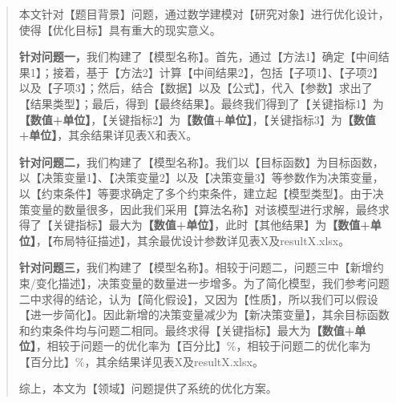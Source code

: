 
\begin{abstract}

本文针对【题目背景】问题，通过数学建模对【研究对象】进行优化设计，使得【优化目标】具有重大的现实意义。

\textbf{针对问题一，}我们构建了【模型名称】。首先，通过【方法1】确定【中间结果1】；接着，基于【方法2】计算【中间结果2】，包括【子项1】、【子项2】以及【子项3】；然后，结合【数据】以及【公式】，代入【参数】求出了【结果类型】；最后，得到【最终结果】。最终我们得到了【关键指标1】为\textbf{【数值+单位】}，【关键指标2】为\textbf{【数值+单位】}，【关键指标3】为\textbf{【数值+单位】}，其余结果详见表X和表X。

\textbf{针对问题二，}我们构建了【模型名称】。我们以【目标函数】为目标函数，以【决策变量1】、【决策变量2】以及【决策变量3】等参数作为决策变量，以【约束条件】等要求确定了多个约束条件，建立起【模型类型】。由于决策变量的数量很多，因此我们采用【算法名称】对该模型进行求解，最终求得了【关键指标】最大为\textbf{【数值+单位】}，此时【其他结果】为\textbf{【数值+单位】}，【布局特征描述】，其余最优设计参数详见表X及resultX.xlsx。

\textbf{针对问题三，}我们构建了【模型名称】。相较于问题二，问题三中【新增约束/变化描述】，决策变量的数量进一步增多。为了简化模型，我们参考问题二中求得的结论，认为【简化假设】，又因为【性质】，所以我们可以假设【进一步简化】。因此新增的决策变量减少为【新决策变量】，其余目标函数和约束条件均与问题二相同。最终求得【关键指标】最大为\textbf{【数值+单位】}，相较于问题一的优化率为【百分比】\%，相较于问题二的优化率为【百分比】\%，其余结果详见表X及resultX.xlsx。

综上，本文为【领域】问题提供了系统的优化方案。


\end{abstract}
